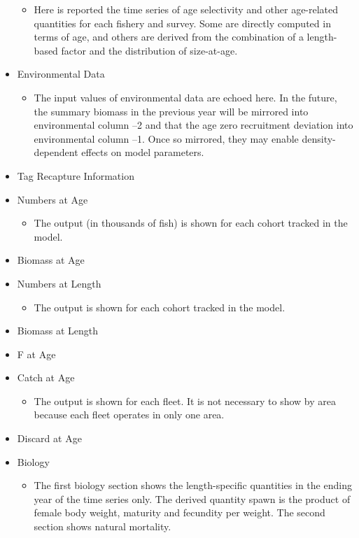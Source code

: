 \begin{itemize}
\begin{itemize}
		\item Here is reported the time series of age selectivity and other age-related quantities for each fishery and survey. Some are directly computed in terms of age, and others are derived from the combination of a length-based factor and the distribution of size-at-age.
	\end{itemize}
	\item Environmental Data
	\begin{itemize}
		\item The input values of environmental data are echoed here. In the future, the summary biomass in the previous year will be mirrored into environmental column –2 and that the age zero recruitment deviation into environmental column –1. Once so mirrored, they may enable density-dependent effects on model parameters.
	\end{itemize}
	\item Tag Recapture Information
	\item Numbers at Age
	\begin{itemize}
		\item The output (in thousands of fish) is shown for each cohort tracked in the model.
	\end{itemize}
	\item Biomass at Age
	\item Numbers at Length
	\begin{itemize}
		\item The output is shown for each cohort tracked in the model.
	\end{itemize}
	\item Biomass at Length
	\item F at Age
	\item Catch at Age
	\begin{itemize}
		\item The output is shown for each fleet.  It is not necessary to show by area because each fleet operates in only one area.
	\end{itemize}
	\item Discard at Age
	\item Biology
	\begin{itemize}
		\item The first biology section shows the length-specific quantities in the ending year of the time series only. The derived quantity spawn is the product of female body weight, maturity and fecundity per weight. The second section shows natural mortality.
	\end{itemize}

\end{itemize}
